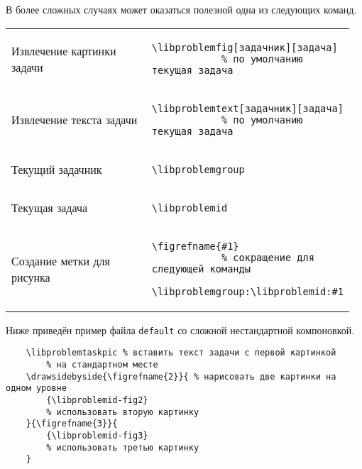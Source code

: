 В более сложных случаях может оказаться полезной одна из следующих команд.

\noindent
\begin{tabular}{S{0.48\linewidth} S{0.485\linewidth}}
    Извлечение картинки задачи &
        \begin{lstlisting}[style = listtable, gobble = 10]
            \libproblemfig[задачник][задача]
            % по умолчанию текущая задача
        \end{lstlisting} \\
    Извлечение текста задачи &
        \begin{lstlisting}[style = listtable, gobble = 10]
            \libproblemtext[задачник][задача]
            % по умолчанию текущая задача
        \end{lstlisting} \\
    Текущий задачник &
        \begin{lstlisting}[style = listtable, gobble = 10]
            \libproblemgroup
        \end{lstlisting} \\
    Текущая задача &
        \begin{lstlisting}[style = listtable, gobble = 10]
            \libproblemid
        \end{lstlisting} \\
    Создание метки для рисунка &
        \begin{lstlisting}[style = listtable, gobble = 10]
            \figrefname{#1}
            % сокращение для следующей команды
            \libproblemgroup:\libproblemid:#1
        \end{lstlisting} \\
\end{tabular}

Ниже приведён пример файла \texttt{default} со сложной нестандартной компоновкой.

\begin{lstlisting}
    \libproblemtaskpic % вставить текст задачи с первой картинкой
        % на стандартном месте
    \drawsidebyside{\figrefname{2}}{ % нарисовать две картинки на одном уровне
        {\libproblemid-fig2}
        % использовать вторую картинку
    }{\figrefname{3}}{
        {\libproblemid-fig3}
        % использовать третью картинку
    }
\end{lstlisting}